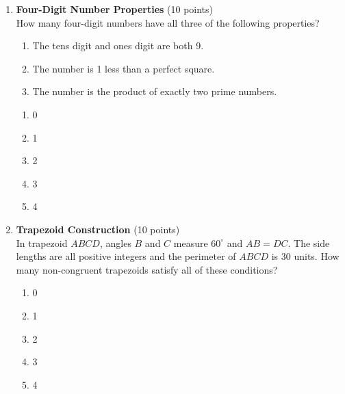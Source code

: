 \begin{enumerate}
  \item \textbf{Four-Digit Number Properties} (10 points)\\
  How many four-digit numbers have all three of the following properties?
  \begin{enumerate}[label=(\Roman*)]
    \item The tens digit and ones digit are both 9.
    \item The number is 1 less than a perfect square.
    \item The number is the product of exactly two prime numbers.
  \end{enumerate}
  \begin{enumerate}[label=(\Alph*)]
    \item 0
    \item 1
    \item 2
    \item 3
    \item 4
  \end{enumerate}
  \begin{subanswer}
  \end{subanswer}

  \item \textbf{Trapezoid Construction} (10 points)\\
  In trapezoid $ABCD$, angles $B$ and $C$ measure $60^{\circ}$ and $AB=DC$. The side lengths are all positive integers and the perimeter of $ABCD$ is 30 units. How many non-congruent trapezoids satisfy all of these conditions?
  \begin{enumerate}[label=(\Alph*)]
    \item 0
    \item 1
    \item 2
    \item 3
    \item 4
  \end{enumerate}
  \begin{subanswer}
  \end{subanswer}


  \newpage



\end{enumerate}
